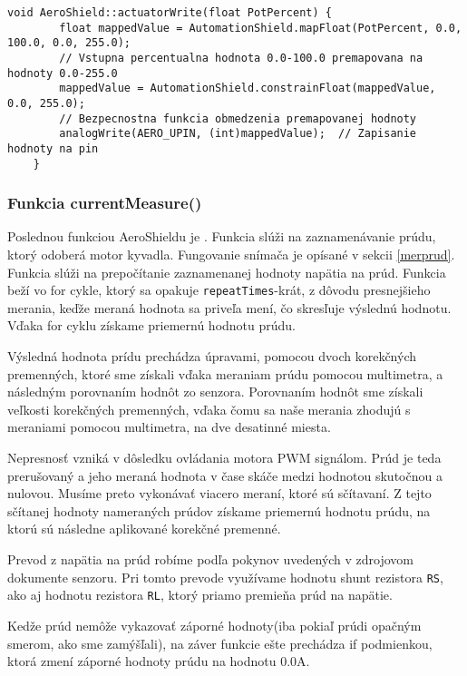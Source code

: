 	
\begin{lstlisting}[caption={Zdrojový kód funkcie actuatorWrite.},captionpos=b]
	void AeroShield::actuatorWrite(float PotPercent) {   
		float mappedValue = AutomationShield.mapFloat(PotPercent, 0.0, 100.0, 0.0, 255.0);       
		// Vstupna percentualna hodnota 0.0-100.0 premapovana na hodnoty 0.0-255.0
		mappedValue = AutomationShield.constrainFloat(mappedValue, 0.0, 255.0);  
		// Bezpecnostna funkcia obmedzenia premapovanej hodnoty
		analogWrite(AERO_UPIN, (int)mappedValue);  // Zapisanie hodnoty na pin
	}
\end{lstlisting}
	
	
\subsubsection{Funkcia currentMeasure()}	
	
Poslednou funkciou AeroShieldu je . Funkcia slúži na zaznamenávanie prúdu, ktorý odoberá motor kyvadla. Fungovanie snímača je opísané v sekcii \ref{merprud}. Funkcia slúži na prepočítanie zaznamenanej hodnoty napätia na prúd. Funkcia beží vo for cykle, ktorý sa opakuje \verb|repeatTimes|-krát, z dôvodu presnejšieho merania, keďže meraná hodnota sa priveľa mení, čo skresľuje výslednú hodnotu. Vďaka for cyklu získame priemernú hodnotu prúdu. 

Výsledná hodnota prídu prechádza úpravami, pomocou dvoch korekčných premenných, ktoré sme získali vďaka meraniam prúdu pomocou multimetra, a následným porovnaním hodnôt zo senzora. Porovnaním hodnôt sme získali veľkosti korekčných premenných, vďaka čomu sa naše merania zhodujú s meraniami pomocou multimetra, na dve desatinné miesta. 

Nepresnosť vzniká v dôsledku ovládania motora PWM signálom. Prúd je teda prerušovaný a jeho meraná hodnota v čase skáče medzi hodnotou skutočnou a nulovou. Musíme preto vykonávať viacero meraní, ktoré sú sčítavaní. Z tejto sčítanej hodnoty nameraných prúdov získame priemernú hodnotu prúdu, na ktorú sú následne aplikované korekčné premenné.  

Prevod z napätia na prúd robíme podľa pokynov uvedených v zdrojovom dokumente senzoru. Pri tomto prevode využívame hodnotu shunt rezistora \verb|RS|, ako aj hodnotu rezistora \verb|RL|, ktorý priamo premieňa prúd na napätie. 

Kedže prúd nemôže vykazovať záporné hodnoty(iba pokiaľ prúdi opačným smerom, ako sme zamýšľali), na záver funkcie ešte prechádza if podmienkou, ktorá zmení záporné hodnoty prúdu na hodnotu 0.0A.  
	
